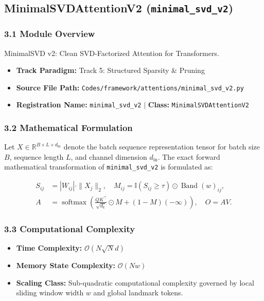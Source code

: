 \subsection{MinimalSVDAttentionV2 (\texttt{minimal\_svd\_v2})}
\label{sec:app_module_minimal_svd_v2}

\subsubsection*{3.1 Module Overview}
MinimalSVD v2: Clean SVD-Factorized Attention for Transformers.
\begin{itemize}
    \item \textbf{Track Paradigm:} Track 5: Structured Sparsity \& Pruning
    \item \textbf{Source File Path:} \texttt{Codes/framework/attentions/minimal\_svd\_v2.py}
    \item \textbf{Registration Name:} \texttt{minimal\_svd\_v2} $\mid$ \textbf{Class:} \texttt{MinimalSVDAttentionV2}
\end{itemize}

\subsubsection*{3.2 Mathematical Formulation}
Let $X \in \mathbb{R}^{B \times L \times d_{\text{in}}}$ denote the batch sequence representation tensor for batch size $B$, sequence length $L$, and channel dimension $d_{\text{in}}$. The exact forward mathematical transformation of \texttt{minimal\_svd\_v2} is formulated as:

\begin{align}
S_{ij} &= |W_{ij}| \cdot \|X_j\|_2, \quad M_{ij} = \mathbb{I}(S_{ij} \ge \tau) \odot \operatorname{Band}(w)_{ij}, \\
A &= \operatorname{softmax}\left(\frac{Q K^\top}{\sqrt{d_k}} \odot M + (1 - M)(-\infty)\right), \quad O = A V.
\end{align}


\subsubsection*{3.3 Computational Complexity}
\begin{itemize}
    \item \textbf{Time Complexity:} $\mathcal{O}(N \sqrt{N} d)$
    \item \textbf{Memory State Complexity:} $\mathcal{O}(N w)$
    \item \textbf{Scaling Class:} Sub-quadratic computational complexity governed by local sliding window width $w$ and global landmark tokens.
\end{itemize}


